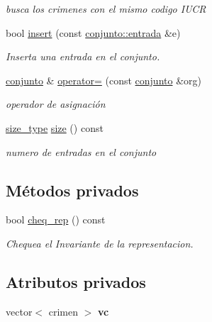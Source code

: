 \begin{DoxyCompactItemize}
\begin{DoxyCompactList}\small\item\em busca los crimenes con el mismo codigo I\+U\+C\+R \end{DoxyCompactList}\item 
bool \hyperlink{classconjunto_aa65b9f7c4cb9bad6d4e40c1973095930}{insert} (const \hyperlink{classconjunto_a09cad766dd65de73e51eae21f9d22585}{conjunto\+::entrada} \&e)
\begin{DoxyCompactList}\small\item\em Inserta una entrada en el conjunto. \end{DoxyCompactList}\item 
\hyperlink{classconjunto}{conjunto} \& \hyperlink{classconjunto_a2bdce402a4b76117b68fe71c0dffab87}{operator=} (const \hyperlink{classconjunto}{conjunto} \&org)
\begin{DoxyCompactList}\small\item\em operador de asignación \end{DoxyCompactList}\item 
\hyperlink{classconjunto_a855a5893bb0f5a851ab2dbf2b8aa6cc7}{size\+\_\+type} \hyperlink{classconjunto_a863e1e106e35adda47e7c5e2067295b9}{size} () const 
\begin{DoxyCompactList}\small\item\em numero de entradas en el conjunto \end{DoxyCompactList}\end{DoxyCompactItemize}
\subsection*{Métodos privados}
\begin{DoxyCompactItemize}
\item 
bool \hyperlink{classconjunto_adb0ff15cf65817b0b279bae4bf06decb}{cheq\+\_\+rep} () const 
\begin{DoxyCompactList}\small\item\em Chequea el Invariante de la representacion. \end{DoxyCompactList}\end{DoxyCompactItemize}
\subsection*{Atributos privados}
\begin{DoxyCompactItemize}
\item 
\hypertarget{classconjunto_aed485e92bb3d8b2c82fc85657947761d}{}vector$<$ crimen $>$ {\bfseries vc}\label{classconjunto_aed485e92bb3d8b2c82fc85657947761d}

\end{DoxyCompactItemize}
